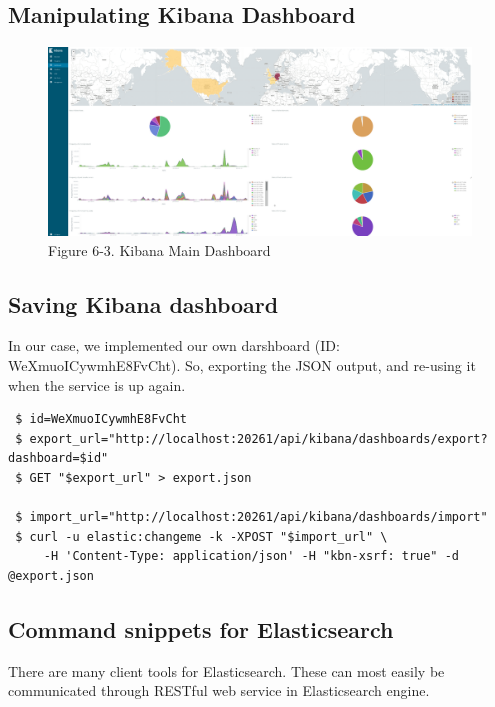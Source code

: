\documentclass[]{article}
\begin{document}
\subsection{Manipulating Kibana
Dashboard}\label{manipulating-kibana-dashboard}

\begin{figure}[htbp]
\centering
\includegraphics{images/kibana_error.png}
\caption{Figure 6-3. Kibana Main Dashboard}
\end{figure}

\subsection{Saving Kibana dashboard}\label{saving-kibana-dashboard}

In our case, we implemented our own darshboard (ID:
WeXmuoICywmhE8FvCht). So, exporting the JSON output, and re-using it
when the service is up again.

\begin{verbatim}
 $ id=WeXmuoICywmhE8FvCht
 $ export_url="http://localhost:20261/api/kibana/dashboards/export?dashboard=$id"
 $ GET "$export_url" > export.json

 $ import_url="http://localhost:20261/api/kibana/dashboards/import"
 $ curl -u elastic:changeme -k -XPOST "$import_url" \
     -H 'Content-Type: application/json' -H "kbn-xsrf: true" -d @export.json
\end{verbatim}

\subsection{Command snippets for
Elasticsearch}\label{command-snippets-for-elasticsearch}

There are many client tools for Elasticsearch. These can most easily be
communicated through RESTful web service in Elasticsearch engine.
\end{document}
